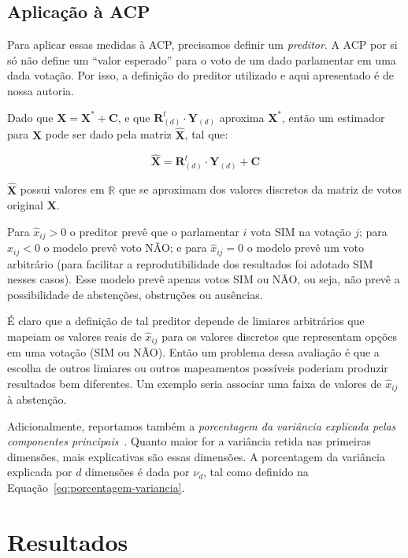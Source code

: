 \documentclass[
	article,			%
	12pt,				%
    twoside,			%
	a4paper,			%
	english,			%
	french,				%
	spanish,			%
	brazil,				%
	]{abntex2}
\newcommand\nay{NÃO\xspace}
\newcommand\yea{SIM\xspace}
\begin{document}
\subsection{Aplicação à ACP}
\label{sec:avaliacao_acp}

Para aplicar essas medidas à ACP, precisamos definir um \emph{preditor}. A ACP por si só não define um ``valor esperado'' para o voto de um dado parlamentar em uma dada votação. Por isso, a definição do preditor utilizado e aqui apresentado é de nossa autoria.

Dado que $\mathbf{X = X^* + C}$, e que $\mathbf{R}_{(d)}^{t}\cdot \mathbf{Y}_{(d)}$ aproxima $\mathbf{X^*}$, então um estimador para $\mathbf{X}$ pode ser dado pela matriz $\mathbf{\widehat{X}}$, tal que:

\begin{equation}
  \widehat{\mathbf{X}} = \mathbf{R}_{(d)}^{t} \cdot \mathbf{Y}_{(d)} + \mathbf{C}
\end{equation}

$\widehat{\mathbf{X}}$ possui valores em $\mathbb{R}$ que se aproximam dos valores discretos da matriz de votos original $\mathbf{X}$.

Para $\widehat{x}_{ij} > 0$ o preditor prevê que o parlamentar $i$ vota \yea na votação $j$; para $\widehat{x}_{ij} < 0$ o modelo prevê voto \nay; e para $\widehat{x}_{ij} = 0$ o modelo prevê um voto arbitrário (para facilitar a reprodutibilidade dos resultados foi adotado \yea nesses casos). Esse modelo prevê apenas votos \yea ou \nay, ou seja, não prevê a possibilidade de abstenções, obstruções ou ausências.

É claro que a definição de tal preditor depende de limiares arbitrários que mapeiam os valores reais de $\widehat{x}_{ij}$ para os valores discretos que representam opções em uma votação (\yea ou \nay). Então um problema dessa avaliação é que a escolha de outros limiares ou outros mapeamentos possíveis poderiam produzir resultados bem diferentes. Um exemplo seria associar uma faixa de valores de $\widehat{x}_{ij}$ à abstenção.

Adicionalmente, reportamos também a \emph{porcentagem da variância explicada pelas componentes principais}~\cite{DataMining2003}. Quanto maior for a variância retida nas primeiras dimensões, mais explicativas são essas dimensões. A porcentagem da variância explicada por $d$ dimensões é dada por $\nu_d$, tal como definido na Equação~\ref{eq:porcentagem-variancia}.

\section{Resultados}
\label{sec:resultados}
\end{document}
